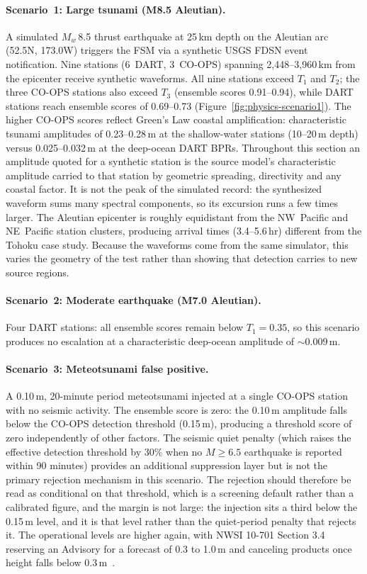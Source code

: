 \documentclass{article}
\begin{document}
\paragraph{Scenario~1: Large tsunami (M8.5 Aleutian).}
A simulated $M_w$\,8.5 thrust earthquake at 25\,km depth on the
Aleutian arc (52.5\textdegree N, 173.0\textdegree W) triggers the
FSM via a synthetic USGS FDSN event notification.
Nine stations (6~DART, 3~CO-OPS) spanning 2{,}448--3{,}960\,km from
the epicenter receive synthetic waveforms.
All nine stations exceed $T_1$ and $T_2$; the three CO-OPS stations
also exceed $T_3$ (ensemble scores 0.91--0.94), while DART stations reach
ensemble scores of 0.69--0.73 (Figure~\ref{fig:physics-scenario1}).
The higher CO-OPS scores reflect Green's Law coastal amplification:
characteristic tsunami amplitudes of 0.23--0.28\,m at the shallow-water
stations (10--20\,m depth) versus 0.025--0.032\,m at the deep-ocean DART
BPRs.  Throughout this section an amplitude quoted for a synthetic station
is the source model's characteristic amplitude carried to that station by
geometric spreading, directivity and any coastal factor.  It is not the peak
of the simulated record: the synthesized waveform sums many spectral
components, so its excursion runs a few times larger.
The Aleutian epicenter is roughly equidistant from the NW~Pacific and
NE~Pacific station clusters, producing arrival times (3.4--5.6\,hr)
different from the Tohoku case study.  Because the waveforms come from
the same simulator, this varies the geometry of the test rather than
showing that detection carries to new source regions.

\paragraph{Scenario~2: Moderate earthquake (M7.0 Aleutian).}
Four DART stations: all ensemble scores remain below $T_1 = 0.35$, so this scenario
produces no escalation at a characteristic deep-ocean amplitude of
${\sim}0.009$\,m.

\paragraph{Scenario~3: Meteotsunami false positive.}
A 0.10\,m, 20-minute period meteotsunami injected at a single CO-OPS
station with no seismic activity.  The ensemble score is zero:
the 0.10\,m amplitude falls below the CO-OPS detection threshold
(0.15\,m), producing a threshold score of zero independently of
other factors.  The seismic quiet penalty (which raises the effective
detection threshold by 30\% when no $M \geq 6.5$ earthquake is
reported within 90 minutes) provides an additional suppression layer
but is not the primary rejection mechanism in this scenario.
The rejection should therefore be read as conditional on that
threshold, which is a screening default rather than a calibrated
figure, and the margin is not large: the injection sits a third below
the 0.15\,m level, and it is that level rather than the quiet-period
penalty that rejects it.  The operational levels are higher again,
with NWSI 10-701 Section 3.4 reserving an Advisory for a forecast of
0.3 to 1.0\,m and canceling products once height falls below
0.3\,m~\citep{nwsi10701}.
\end{document}
